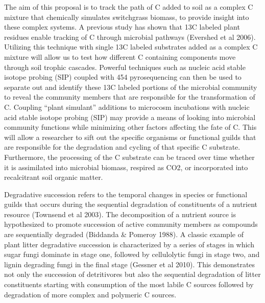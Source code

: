 The aim of this proposal is to track the path of C added to soil as a complex C mixture that chemically simulates switchgrass biomass, to provide insight into these complex systems.  A previous study has shown that 13C labeled plant residues enable tracking of C through microbial pathways (Evershed et al 2006).  Utilizing this technique with single 13C labeled substrates added as a complex C mixture will allow us to test how different C containing components move through soil trophic cascades. Powerful techniques such as nucleic acid stable isotope probing (SIP) coupled with 454 pyrosequencing can then be used to separate out and identify these 13C labeled portions of the microbial community to reveal the community members that are responsible for the transformation of C. Coupling “plant simulant” additions to microcosm incubations with nucleic acid stable isotope probing (SIP) may provide a means of looking into microbial community functions while minimizing other factors affecting the fate of C.  This will allow a researcher to sift out the specific organisms or functional guilds that are responsible for the degradation and cycling of that specific C substrate.  Furthermore, the processing of the C substrate can be traced over time whether it is assimilated into microbial biomass, respired as CO2, or incorporated into recalcitrant soil organic matter.


Degradative succession refers to the temporal changes in species or functional guilds that occurs during the sequential degradation of constituents of a nutrient resource (Townsend et al 2003).  The decomposition of a nutrient source is hypothesized to promote succession of active community members as compounds are sequentially degraded (Biddanda & Pomeroy 1988).  A classic example of plant litter degradative succession is characterized by a series of stages in which sugar fungi dominate in stage one, followed by cellulolytic fungi in stage two, and lignin degrading fungi in the final stage (Gessner et al 2010).  This demonstrates not only the succession of detritivores but also the sequential degradation of litter constituents starting with consumption of the most labile C sources followed by degradation of more complex and polymeric C sources. 

